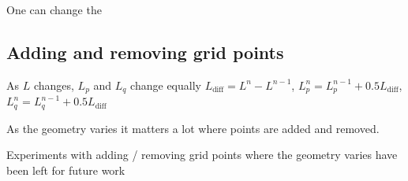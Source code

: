One can change the 


\subsection{Adding and removing grid points}
As $L$ changes, $L_p$ and $L_q$ change equally
$L_\text{diff} = L^n-L^{n-1}$, $L_p^n = L_p^{n-1} + 0.5 L_\text{diff}$, $L_q^n =  L_q^{n-1} + 0.5L_\text{diff}$


As the geometry varies it matters a lot where points are added and removed. 

Experiments with adding / removing grid points where the geometry varies have been left for future work